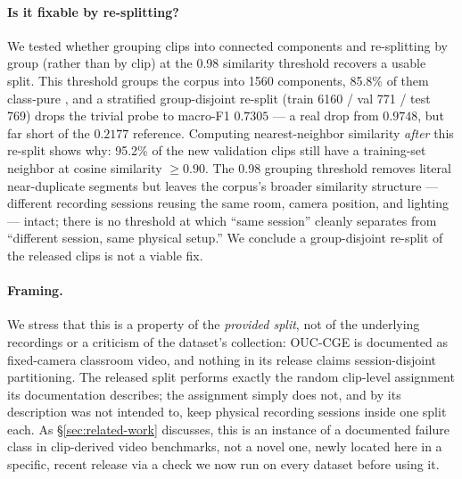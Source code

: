 \paragraph{Is it fixable by re-splitting?}
We tested whether grouping clips into connected components and re-splitting
by group (rather than by clip) at the 0.98 similarity threshold recovers a
usable split. This threshold groups
the corpus into 1560 components, 85.8\% of them class-pure
, and a stratified group-disjoint re-split
(train 6160 / val 771 / test 769) drops the trivial probe to
macro-F1 $0.7305$ --- a real drop from $0.9748$, but far short of the
$0.2177$ reference. Computing nearest-neighbor similarity \emph{after} this
re-split shows why:
95.2\% of the new validation clips still have a training-set neighbor at
cosine similarity $\geq 0.90$. The 0.98 grouping threshold removes literal
near-duplicate segments but leaves the corpus's broader similarity structure
--- different recording sessions reusing the same room, camera position, and
lighting --- intact; there is no threshold at which ``same session'' cleanly
separates from ``different session, same physical setup.'' We conclude a
group-disjoint re-split of the released clips is not a viable fix.

\paragraph{Framing.}
We stress that this is a property of the \emph{provided split}, not of the
underlying recordings or a criticism of the dataset's collection: OUC-CGE is
documented as fixed-camera classroom video, and nothing in its release
claims session-disjoint partitioning. The released split performs exactly
the random clip-level assignment its documentation describes; the assignment
simply does not, and by its description was not intended to, keep physical
recording sessions inside one split each. As \S\ref{sec:related-work}
discusses, this is an instance of a documented failure class in
clip-derived video benchmarks, not a novel one, newly located here in a
specific, recent release via a check we now run on every dataset before
using it.

